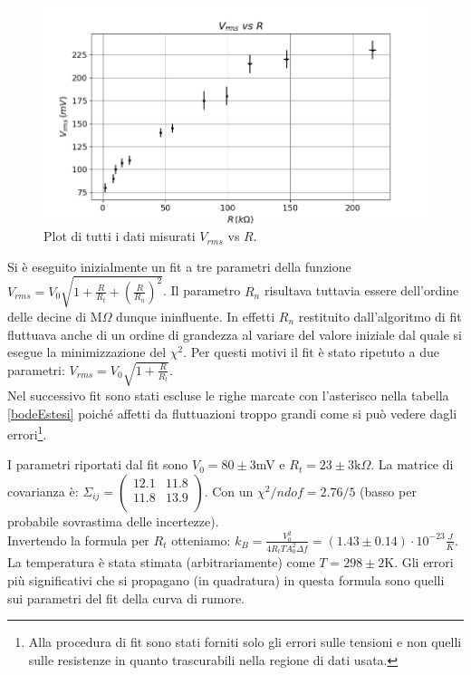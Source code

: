 \documentclass[10pt,a4paper]{article}
\begin{document}
\begin{figure}[!htb]
\centering
\includegraphics[scale=0.7]{boltzmannEsteso.png}
\caption{Plot di tutti i dati misurati $V_{rms}$ vs $R$.\label{boltzmannEsteso}}
\end{figure}

Si è eseguito inizialmente un fit a tre parametri della funzione $V_{rms} = V_0 \sqrt{1+\frac{R}{R_t}+(\frac{R}{R_n})^2}$. Il parametro $R_n$ risultava tuttavia essere dell'ordine delle decine di $\mbox{M}\Omega$ dunque ininfluente. In effetti $R_n$ restituito dall'algoritmo di fit fluttuava anche di un ordine di grandezza al variare del valore iniziale dal quale si esegue la minimizzazione del $\chi^2$. Per questi motivi il fit è stato ripetuto a due parametri: $V_{rms} = V_0 \sqrt{1+\frac{R}{R_t}}$.
\\
Nel successivo fit sono stati escluse le righe marcate con l'asterisco nella tabella \ref{bodeEstesi} poiché affetti da fluttuazioni troppo grandi come si può vedere dagli errori\footnote{Alla procedura di fit sono stati forniti solo gli errori sulle tensioni e non quelli sulle resistenze in quanto trascurabili nella regione di dati usata.}.

I parametri riportati dal fit sono $V_0 = 80 \pm 3$mV e $R_t = 23 \pm 3 \mbox{k}\Omega$. La matrice di covarianza è:  $\Sigma_{ij} = \left( \begin{array}{cc}
12.1 & 11.8\\ 
11.8 & 13.9\\
\end{array} \right)$. Con un $\chi^2/ndof = 2.76/5$ (basso per probabile sovrastima delle incertezze).\\
Invertendo la formula per $R_t$ otteniamo: $k_B = \frac{V_0^2}{4 R_t T A_0^2 \Delta f}=(1.43 \pm 0.14) \cdot 10^{-23} \frac{J}{K}$. La temperatura è stata stimata (arbitrariamente) come $T = 298 \pm 2$K. Gli errori più significativi che si propagano (in quadratura) in questa formula sono quelli sui parametri del fit della curva di rumore.
\end{document}
